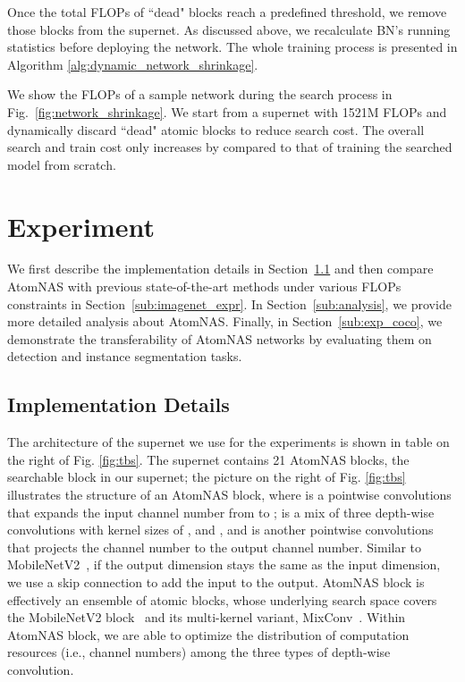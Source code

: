 \documentclass{article} \usepackage{iclr2020_conference,times}
\newcommand{\flops}{FLOPs\xspace}
\begin{document}
Once the total \flops of ``dead" blocks reach a predefined threshold, we remove those blocks from the supernet. As discussed above, we recalculate BN's running statistics before deploying the network. The whole training process is presented in Algorithm \ref{alg:dynamic_network_shrinkage}.

We show the \flops of a sample network during the search process in Fig.~\ref{fig:network_shrinkage}. We start from a supernet with 1521M \flops and dynamically discard ``dead" atomic blocks to reduce search cost. The overall search and train cost only increases by  compared to that of training the searched model from scratch.






\section{Experiment}

We first describe the implementation details in Section~\ref{sub:impl} and then compare AtomNAS with previous state-of-the-art methods under various \flops constraints in Section~\ref{sub:imagenet_expr}. 
In Section~\ref{sub:analysis}, we provide more detailed analysis about AtomNAS. Finally, in Section~\ref{sub:exp_coco}, we demonstrate the transferability of AtomNAS networks by evaluating them on detection and instance segmentation tasks.



\subsection{Implementation Details}
\label{sub:impl}

The architecture of the supernet we use for the experiments is shown in table on the right of Fig. \ref{fig:tbs}. The supernet contains 21 AtomNAS blocks, the searchable block in our supernet; the picture on the right of Fig. \ref{fig:tbs} illustrates the structure of an AtomNAS block, where  is a  pointwise convolutions that expands the input channel number from  to ;  is a mix of three depth-wise convolutions with kernel sizes of ,  and , and  is another  pointwise convolutions that projects the channel number to the output channel number. Similar to MobileNetV2~\citep{sandler2018mobilenetv2}, if the output dimension stays the same as the input dimension, we use a skip connection to add the input to the output. AtomNAS block is effectively an ensemble of  atomic blocks, whose underlying search space covers the MobileNetV2 block~\citep{sandler2018mobilenetv2} and its multi-kernel variant, MixConv~\citep{tan2019mixnet}. Within AtomNAS block, we are able to optimize the distribution of computation resources (i.e., channel numbers) among the three types of depth-wise convolution.
\end{document}
